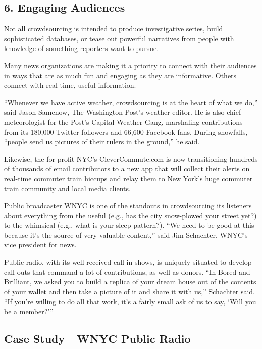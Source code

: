 \begin{itemize}
\begin{itemize}
\begin{enumerate}
{\section{6. Engaging Audiences} 

Not all crowdsourcing is intended to produce investigative series, build sophisticated databases, or tease out powerful narratives from people with knowledge of something reporters want to pursue.

Many news organizations are making it a priority to connect with their audiences in ways that are as much fun and engaging as they are informative. Others connect with real-time, useful information.  

“Whenever we have active weather, crowdsourcing is at the heart of what we do,” said Jason Samenow, The Washington Post’s weather editor. He is also chief meteorologist for the Post’s Capital Weather Gang, marshaling contributions from its 180,000 Twitter followers and 66,600 Facebook fans. During snowfalls, “people send us pictures of their rulers in the ground,” he said.\autocite{weather}

Likewise, the for-profit NYC’s CleverCommute.com is now transitioning hundreds of thousands of email contributors to a new app that will collect their alerts on real-time commuter train hiccups and relay them to New York’s huge commuter train community and local media clients.\autocite{Commute}

Public broadcaster WNYC is one of the standouts in crowdsourcing its listeners about everything from the useful (e.g., has the city snow-plowed your street yet?) to the whimsical (e.g., what is your sleep pattern?).
“We need to be good at this because it’s the source of very valuable content,” said Jim Schachter, WNYC’s vice president for news.\autocite{Schachter}

Public radio, with its well-received call-in shows, is uniquely situated to develop call-outs that command a lot of contributions, as well as donors. “In Bored and Brilliant, we asked you to build a replica of your dream house out of the contents of your wallet and then take a picture of it and share it with us,” Schachter said. “If you’re willing to do all that work, it’s a fairly small ask of us to say, ‘Will you be a member?’”

\subsection{Case Study---WNYC Public Radio}

}
\end{enumerate}
\end{itemize}
\end{itemize}
